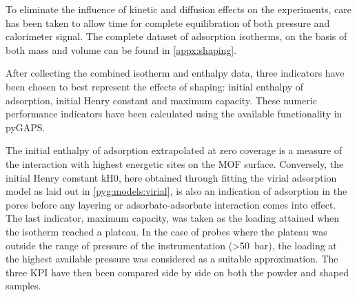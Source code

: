 To eliminate the influence of kinetic and diffusion effects on the 
experiments, care has been taken to allow time for complete equilibration
of both pressure and calorimeter signal.
The complete dataset of adsorption isotherms, on the basis of both mass
and volume can be found in \autoref{appx:shaping}.

After collecting the combined isotherm and enthalpy data, three
indicators have been chosen to best represent the effects of shaping:
initial enthalpy of adsorption, initial Henry constant and maximum capacity.
These numeric performance indicators have been calculated using the
available functionality in pyGAPS.

The initial enthalpy of adsorption extrapolated at zero coverage is
a measure of the interaction with highest energetic sites on the \gls{MOF}
surface. Conversely, the initial Henry constant \gls{kH0}, here 
obtained through fitting the virial adsorption model as laid out in
\autoref{pyg:models:virial}, is also an indication of adsorption in
the pores before any
layering or adsorbate-adsorbate interaction comes into effect.
The last indicator, maximum capacity, was taken as the loading attained when
the isotherm reached a plateau. In the case of probes where the plateau
was outside the range of pressure of the instrumentation (>\SI{50}{\bar}),
the loading at the highest available pressure was considered as a
suitable approximation.
The three \gls{KPI} have then been compared side by
side on both the powder and shaped samples.





